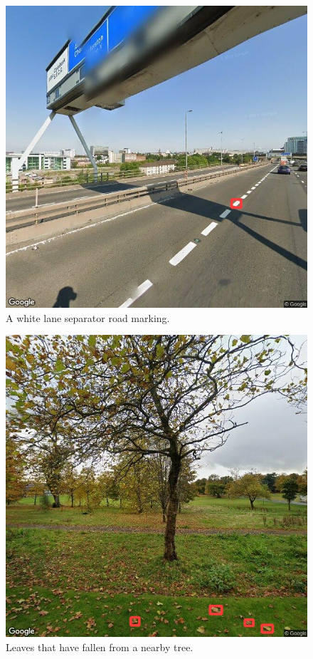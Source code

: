 \documentclass{thesis}
\begin{document}
\begin{appendices}
\begin{figure}[h]
    \centering
    \includegraphics[scale=0.45]{images/flaw-road-marking.jpg}
    \caption{A white lane separator road marking.}
\end{figure}

\begin{figure}[h]
    \centering
    \includegraphics[scale=0.45]{images/flaw-tree-leaves.jpg}
    \caption{Leaves that have fallen from a nearby tree.}
\end{figure}

\end{appendices}



\renewcommand{\thechapter}{0} %

\end{document}
